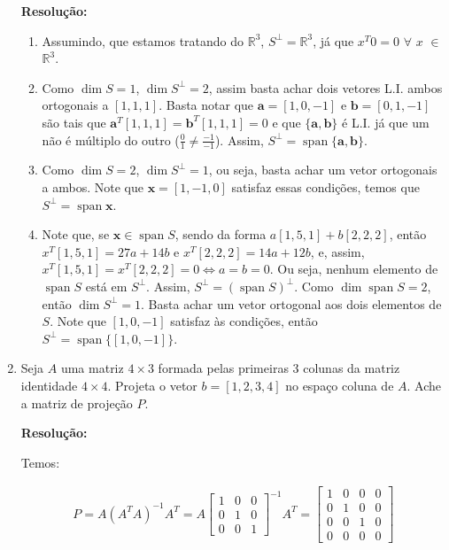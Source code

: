 \documentclass[leqno]{article}
\DeclareMathOperator{\spn}{span}
\begin{document}
\begin{enumerate}
    \textbf{Resolução:}
    
    \begin{enumerate}
        \item Assumindo, que estamos tratando do $\mathbb{R}^3$, $S^{\perp}=\mathbb{R}^3$, já que $x^T0=0$ $\forall$ $x$ $\in$ $\mathbb{R}^3$.
        
        \item Como $\dim S = 1$, $\dim S^{\perp}=2$, assim basta achar dois vetores L.I. ambos ortogonais a $[1,1,1]$. Basta notar que $\textbf{a}=[1,0,-1]$ e $\textbf{b}=[0,1,-1]$ são tais  que $\textbf{a}^T[1,1,1]=\textbf{b}^T[1,1,1]=0$ e que $\{\textbf{a},\textbf{b}\}$ é L.I. já que um não é múltiplo do outro ($\frac{0}{1}\neq\frac{-1}{-1}$). Assim, $S^{\perp}=\spn{\{\textbf{a},\textbf{b}\}}$.
        
        \item Como $\dim S=2$, $\dim S^{\perp}=1$, ou seja, basta achar um vetor ortogonais a ambos. Note que $\textbf{x}=[1,-1,0]$ satisfaz essas condições, temos que $S^{\perp}=\spn{\textbf{x}}$.
        
        \item Note que, se $\textbf{x}\in\spn{S}$, sendo da forma $a[1,5,1]+b[2,2,2]$, então $x^T[1,5,1]=27a+14b$ e $x^T[2,2,2]=14a+12b$, e, assim, $x^T[1,5,1]=x^T[2,2,2]=0\iff a=b=0$. Ou seja, nenhum elemento de $\spn{S}$ está em $S^{\perp}$. Assim, $S^{\perp}=(\spn{S})^{\perp}$. Como $\dim \spn{S}=2$, então $\dim S^{\perp}=1$. Basta achar um vetor ortogonal aos dois elementos de $S$. Note que $[1,0,-1]$ satisfaz às condições, então $S^{\perp}=\spn{\{[1,0,-1]\}}$.
    \end{enumerate}
    
    \item Seja $A$ uma matriz $4\times3$ formada pelas primeiras 3 colunas da matriz identidade $4\times4$. Projeta o vetor $b=[1,2,3,4]$ no espaço coluna de $A$. Ache a matriz de projeção $P$.
    
    \textbf{Resolução:}
    
    Temos:
    
    \begin{align*}
        P=A(A^TA)^{-1}A^T=A\begin{bmatrix}1 & 0 & 0\\0 & 1 & 0\\0 & 0 & 1\end{bmatrix}^{-1}A^T=\begin{bmatrix}1 & 0 & 0 & 0\\0 & 1 & 0 & 0\\0 & 0 & 1 & 0\\0 & 0 & 0 & 0\end{bmatrix}
    \end{align*}
    

\end{enumerate}
\end{document}
